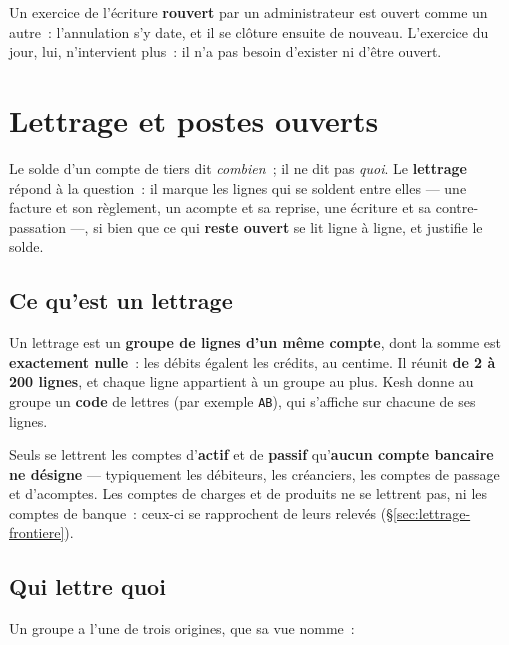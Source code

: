 \documentclass[a4paper,11pt,oneside]{article}
\begin{document}
Un exercice de l'écriture \textbf{rouvert} par un administrateur est ouvert comme un autre~:
l'annulation s'y date, et il se clôture ensuite de nouveau. L'exercice du jour, lui, n'intervient
plus~: il n'a pas besoin d'exister ni d'être ouvert.

\section{Lettrage et postes ouverts}\label{sec:lettrage}

Le solde d'un compte de tiers dit \emph{combien}~; il ne dit pas \emph{quoi}. Le
\textbf{lettrage} répond à la question~: il marque les lignes qui se soldent entre elles ---
une facture et son règlement, un acompte et sa reprise, une écriture et sa contre-passation
---, si bien que ce qui \textbf{reste ouvert} se lit ligne à ligne, et justifie le solde.

\subsection{Ce qu'est un lettrage}

Un lettrage est un \textbf{groupe de lignes d'un même compte}, dont la somme est
\textbf{exactement nulle}~: les débits égalent les crédits, au centime. Il réunit
\textbf{de 2 à 200 lignes}, et chaque ligne appartient à un groupe au plus. Kesh donne au
groupe un \textbf{code} de lettres (par exemple \texttt{AB}), qui s'affiche sur chacune
de ses lignes.

Seuls se lettrent les comptes d'\textbf{actif} et de \textbf{passif} qu'\textbf{aucun compte
bancaire ne désigne} --- typiquement les débiteurs, les créanciers, les comptes de passage et
d'acomptes. Les comptes de charges et de produits ne se lettrent pas, ni les comptes de banque~:
ceux-ci se rapprochent de leurs relevés (\S\ref{sec:lettrage-frontiere}).

\subsection{Qui lettre quoi}

Un groupe a l'une de trois origines, que sa vue nomme~:
\end{document}
